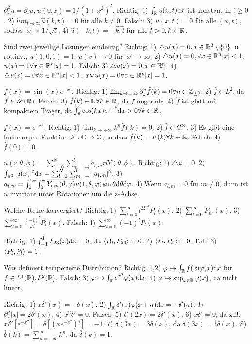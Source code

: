 $\partial_x^2u=\partial_tu$, $u(0,x)=1/(1+x^2)^2$. Richtig: 1) $\int_{\mathbb{R}}u(x,t)\mathrm{d}x$ ist konstant in $t\geq0$. 2) $lim_{t\rightarrow\infty}\hat{u}(k,t)=0$ für alle $k\neq0$. Falsch: 3) $u(x,t)=0$ für alle $(x,t)$, sodass $|x|>1/\sqrt{t}$. 4) $\hat{u}(-k,t)=-\hat{k,t}$ für alle $t>0,k\in\mathbb{R}$.

Sind zwei jeweilige Lösungen eindeutig? Richtig: 1) $\triangle u(x)=0,x\in\mathbb{R}^3\setminus\{0\}$, u rot.inv., $u(1,0,1)=1$, $u(x)\rightarrow0$ für $|x|\rightarrow\infty$. 2) $\triangle u(x)=0, \forall x\in\mathbb{R}^n |x|<1$, $u(x)=1 \forall x\in\mathbb{R}^n |x|=1$. Falsch: 3) $\triangle u(x)=0, x\in\mathbb{R}^n$. 4) $\triangle u(x)=0\forall x\in\mathbb{R}^n |x|<1$, $x\nabla u(x)=0 \forall x\in\mathbb{R}^n |x|=1$.

$f(x)=\sin(x)e^{-x^4}$. Richtig: 1) $\lim_{k\rightarrow\pm\infty}\partial^n_k\hat{f}(k)=0 \forall n\in\mathbb{Z}_{\geq0}$. 2) $\hat{f}\in L^2$, da $f\in\mathscr{S}(\mathbb{R})$. Falsch: 3) $\hat{f}(k)\in\mathbb{R} \forall k\in\mathbb{R}$, da $f$ ungerade. 4) $\hat{f}$ ist glatt mit kompaktem Träger, da $\int_{\mathbb{R}}\cos(kx)e^{-x^4}\mathrm{d}x>0 \forall k\in\mathbb{R}$.

$f(x)=e^{-x^4}$. Richtig: 1) $\lim_{k\rightarrow\pm\infty}k^n\hat{f}(k)=0$. 2) $\hat{f}\in C^{\infty}$. 3) Es gibt eine holomorphe Funktion $F:\mathbb{C}\rightarrow\mathbb{C}$, so dass $\hat{f}(k)=F(k) \forall k\in\mathbb{R}$. Falsch: 4) $\hat{f}(0)=0$.

$u(r,\theta,\phi)=\sum_{l=0}^N\sum_{m=-l}^la_{l,m}rlY(\theta,\phi)$. Richtig: 1) $\triangle u=0$. 2) $\int_{\mathbb{R}^3}|u(x)|^2\mathrm{d}x=\sum_{l=0}^N\sum_{m=-l}^l|a_{l,m}|^2$. 3) $a_{l,m}=\int_0^{2\pi}\int_0^{\pi}\overline{Y_{l,m}(\theta,\varphi)}u(1,\theta,\varphi)\sin\theta\mathrm{d}\theta\mathrm{d}\varphi$. 4) Wenn $a_{l,m}=0$ für $m\neq0$, dann ist $u$ invariant unter Rotationen um die z-Achse.

Welche Reihe konvergiert? Richtig: 1) $\sum_{l=0}^{\infty}l^22^{-l}P_l(x)$. 2) $\sum_{l=0}^{\infty}P_{n^2}(x)$. 3) $\sum_{l=0}^{\infty}\frac{(-1)^l}{\sqrt{l}}P_l(x)$. Falsch: 4) $\sum_{l=0}^{\infty}(-1)^lP_l(x)$.

Richtig: 1) $\int_{-1}^1P_{23}(x)\mathrm{d}x=0$, da $\langle P_0,P_{23} \rangle=0$. 2) $\langle P_l,P_{l'} \rangle=0$. Fal.: 3) $\langle P_l,P_l \rangle=1$.

Was definiert temperierte Distribution? Richtig: 1,2) $\varphi\mapsto\int_{\mathbb{R}} f(x)\varphi(x)\mathrm{d}x$ für $f\in L^1(\mathbb{R}), L^2(\mathbb{R})$. Falsch: 3) $\varphi\mapsto\int_{\mathbb{R}} e^{x^2}\varphi(x)\mathrm{d}x$. 4) $\varphi\mapsto\sup_{x\in\mathbb{R}}\varphi(x)$, da nicht linear.

Richtig: 1) $x\delta'(x)=-\delta(x)$. 2) $\int_{\mathbb{R}}\delta'(x)\varphi(x+a)\mathrm{d}x=-\delta'(a)$. 3) $\partial^3_{x}|x|=2\delta'(x)$. 4) $x^2\delta'=0$.  Falsch: 5) $\delta'(2x)=2\delta'(x)$. 6) $x\delta'=0$, da z.B. $x\delta'[e^{-x^2}]=\delta[(xe^{-x^2})']=-1$. 7) $\delta(3x)=3\delta(x)$, da $\delta(3x)=\frac13\delta(x)$. 8) $\hat{\delta}(k)=\sum_{n=-\infty}^{\infty}k^n$, da $\hat{\delta}(k)=1$.

